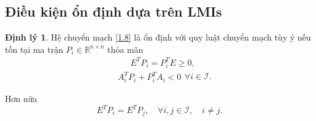 \documentclass[12pt,a4paper]{report}
\theoremstyle{definition}
\newtheorem{dl}{Định lý}
\theoremstyle{definition}
\numberwithin{dl}{chapter}
\numberwithin{vd}{chapter}
\numberwithin{corollary}{chapter}
\numberwithin{lemma}{chapter}
\numberwithin{md}{chapter}
\numberwithin{dn}{chapter}
\numberwithin{cy}{chapter}
\numberwithin{nx}{chapter}
\begin{document}
\subsection{Điều kiện ổn định dựa trên LMIs}
\begin{dl}\label{dl2.1} Hệ chuyển mạch \eqref{1.8} là ổn định với quy luật chuyển mạch tùy ý nếu tồn tại ma trận $P_{i} \in \mathbb{R}^{n \times n}$ thỏa mãn
\begin{equation}
\begin{aligned}\label{2.1}
&E^{T} P_{i}=P_{i}^{T} E \geq 0 , 
\end{aligned} 
\end{equation}
\begin{equation}
\begin{aligned}\label{2.2}
&A_{i}^{T} P_{i}+P_{i}^{T} A_{i}<0  
\end{aligned} 
\forall i \in \mathcal{I}.
\end{equation}

Hơn nữa
\begin{equation}\label{2.3}
E^{T} P_{i}=E^{T} P_{j}, \quad \forall i, j \in \mathcal{I}, \quad i \neq j . 
\end{equation}
\end{dl}
\end{document}
